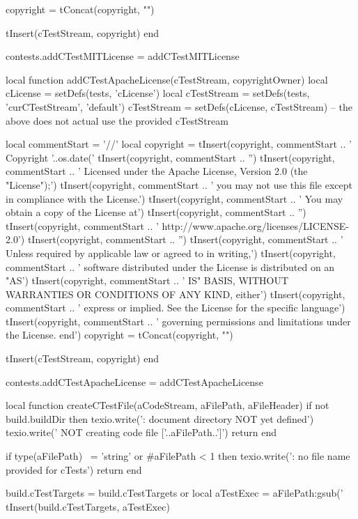   copyright = tConcat(copyright, "\n")

  tInsert(cTestStream, copyright)
end

contests.addCTestMITLicense = addCTestMITLicense

local function addCTestApacheLicense(cTestStream, copyrightOwner)
  local cLicense       = setDefs(tests, 'cLicense')
  local cTestStream    = setDefs(tests, 'curCTestStream', 'default')
  cTestStream          = setDefs(cLicense, cTestStream)
  -- the above does not actual use the provided cTestStream

  local  commentStart = '//'
  local  copyright = { }
  tInsert(copyright, commentStart ..
    ' Copyright '..os.date('%
  tInsert(copyright,  commentStart .. 
    '')
  tInsert(copyright, commentStart ..
    ' Licensed under the Apache License, Version 2.0 (the "License");')
  tInsert(copyright, commentStart ..
    ' you may not use this file except in compliance with the License.')
  tInsert(copyright, commentStart ..
    ' You may obtain a copy of the License at')
  tInsert(copyright, commentStart ..
    '')
  tInsert(copyright, commentStart ..
    '    http://www.apache.org/licenses/LICENSE-2.0')
  tInsert(copyright, commentStart ..
    '')
  tInsert(copyright, commentStart ..
    ' Unless required by applicable law or agreed to in writing,')
  tInsert(copyright, commentStart ..
    ' software distributed under the License is distributed on an "AS')
  tInsert(copyright, commentStart ..
    ' IS" BASIS, WITHOUT WARRANTIES OR CONDITIONS OF ANY KIND, either')
  tInsert(copyright, commentStart ..
    ' express or implied. See the License for the specific language')
  tInsert(copyright, commentStart ..
    ' governing permissions and limitations under the License. end')
  copyright = tConcat(copyright, "\n")

  tInsert(cTestStream, copyright)
end

contests.addCTestApacheLicense = addCTestApacheLicense


local function createCTestFile(aCodeStream, aFilePath, aFileHeader)
  if not build.buildDir then
    texio.write('\nERROR: document directory NOT yet defined\n')
    texio.write('       NOT creating code file ['..aFilePath..']\n\n')
    return
  end

  if type(aFilePath) ~= 'string'
    or #aFilePath < 1 then
    texio.write('\nERROR: no file name provided for cTests\n\n')
    return
  end

  build.cTestTargets = build.cTestTargets or { }
  local aTestExec = aFilePath:gsub('%
  tInsert(build.cTestTargets, aTestExec)


